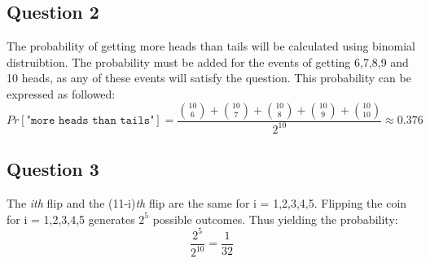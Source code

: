 \documentclass{article}
\begin{document}
\subsection{Question 2}
The probability of getting more heads than tails will be calculated using binomial distruibtion. The probability must be added for the events of getting 6,7,8,9 and 10 heads, as any of these events will satisfy the question. This probability can be expressed as followed:
$$
Pr[\texttt{"more heads than tails"}] = \dfrac{\binom{10}{6} + \binom{10}{7} + \binom{10}{8} + \binom{10}{9} + \binom{10}{10}}{2^{10}} \approx 0.376
$$
\subsection{Question 3}
The \textit{ith} flip and the (11-i)\textit{th} flip are the same for i = 1,2,3,4,5. Flipping the coin for i = 1,2,3,4,5 generates $2^5$ possible outcomes. Thus yielding the probability:
$$
\dfrac{2^5}{2^{10}} = \dfrac{1}{32}
$$
\end{document}
